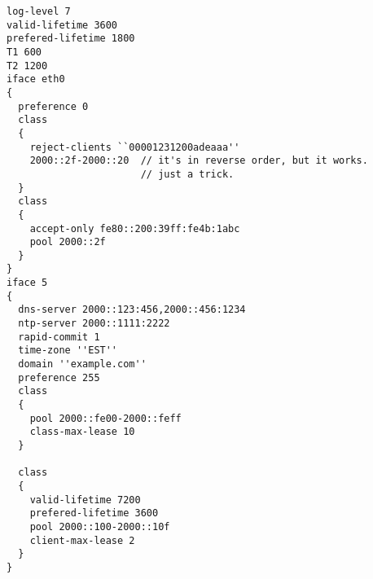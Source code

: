 \begin{verbatim}
log-level 7
valid-lifetime 3600
prefered-lifetime 1800
T1 600
T2 1200
iface eth0
{
  preference 0
  class
  {
    reject-clients ``00001231200adeaaa''
    2000::2f-2000::20  // it's in reverse order, but it works.
                       // just a trick. 
  }
  class
  {
    accept-only fe80::200:39ff:fe4b:1abc
    pool 2000::2f 
  }
}
iface 5
{
  dns-server 2000::123:456,2000::456:1234
  ntp-server 2000::1111:2222
  rapid-commit 1
  time-zone ''EST''
  domain ''example.com''
  preference 255
  class
  {
    pool 2000::fe00-2000::feff
    class-max-lease 10
  }
  
  class
  {
    valid-lifetime 7200
    prefered-lifetime 3600
    pool 2000::100-2000::10f
    client-max-lease 2
  } 
}
\end{verbatim}
